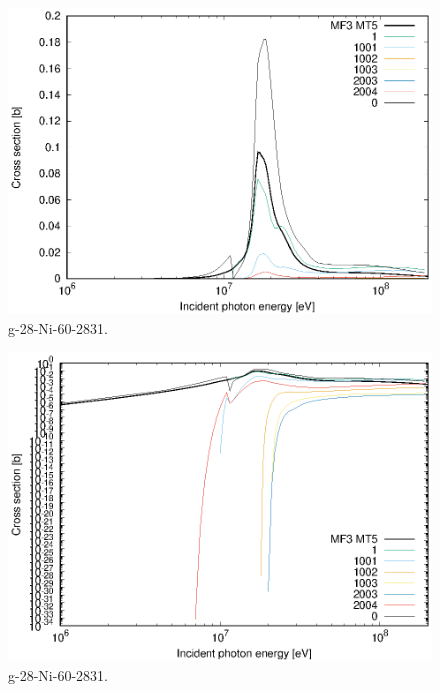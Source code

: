 \begin{figure}
 \includegraphics[width=\linewidth]{eps/g_28-Ni-60_2831.eps}
  \caption{g-28-Ni-60-2831.}
\end{figure}
\begin{figure}
 \includegraphics[width=\linewidth]{eps-log/g_28-Ni-60_2831.eps}
 \caption{g-28-Ni-60-2831.}
\end{figure}
\newpage \clearpage

